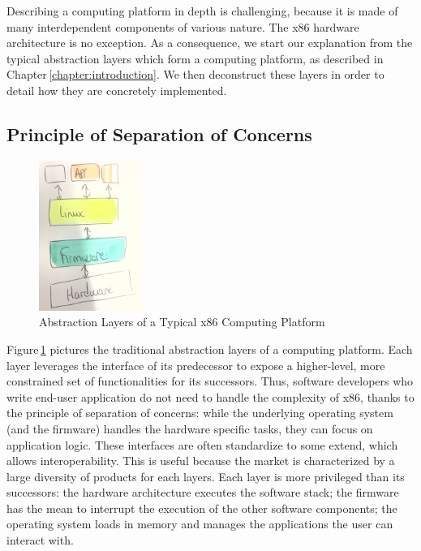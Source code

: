 
Describing a computing platform in depth is challenging, because it is made of
many interdependent components of various nature.
%
The x86 hardware architecture is no exception.
%
As a consequence, we start our explanation from the typical abstraction layers
which form a computing platform, as described in
Chapter\,\ref{chapter:introduction}.
%
We then deconstruct these layers in order to detail how they are concretely
implemented.

\subsection{Principle of Separation of Concerns}

\begin{figure}
  \centering
  \includegraphics[width=0.3\textwidth]{Figures/computing-platform-1.jpg}
  \caption{Abstraction Layers of a Typical x86 Computing Platform}
  \label{fig:usecase:computing-platform-1}
\end{figure}

Figure\,\ref{fig:usecase:computing-platform-1} pictures the traditional
abstraction layers of a computing platform.
%
Each layer leverages the interface of its predecessor to expose a higher-level,
more constrained set of functionalities for its successors.
%
Thus, software developers who write end-user application do not need to handle
the complexity of x86, thanks to the principle of separation of concerns: while
the underlying operating system (and the firmware) handles the hardware specific
tasks, they can focus on application logic.
%
These interfaces are often standardize to some extend, which allows
interoperability.
%
This is useful because the market is characterized by a large diversity of
products for each layers.
%
Each layer is more privileged than its successors:
%
the hardware architecture executes the software stack;
%
the firmware has the mean to interrupt the execution of the other software
components;
%
the operating system loads in memory and manages the applications the user can
interact with.

